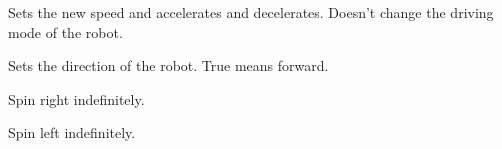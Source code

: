 \documentclass[letterpaper,10pt,english]{sphinxmanual}
\begin{document}
\begin{fulllineitems}
\begin{fulllineitems}
\end{fulllineitems}


\begin{fulllineitems}
\label{\detokenize{autoapi/robotlibrary/robot/index:robotlibrary.robot.Robot.set_speed}}
\pysigstartsignatures
{}
\pysigstopsignatures
\sphinxAtStartPar
Sets the new speed and accelerates and decelerates. Doesn’t change the driving mode of the robot.

\end{fulllineitems}


\begin{fulllineitems}
\label{\detokenize{autoapi/robotlibrary/robot/index:robotlibrary.robot.Robot.set_forward}}
\pysigstartsignatures
{}
\pysigstopsignatures
\sphinxAtStartPar
Sets the direction of the robot. True means forward.

\end{fulllineitems}


\begin{fulllineitems}
\label{\detokenize{autoapi/robotlibrary/robot/index:robotlibrary.robot.Robot.spin_right}}
\pysigstartsignatures
{}
\pysigstopsignatures
\sphinxAtStartPar
Spin right indefinitely.

\end{fulllineitems}


\begin{fulllineitems}
\label{\detokenize{autoapi/robotlibrary/robot/index:robotlibrary.robot.Robot.spin_left}}
\pysigstartsignatures
{}
\pysigstopsignatures
\sphinxAtStartPar
Spin left indefinitely.


\end{fulllineitems}
\end{fulllineitems}
\end{document}
